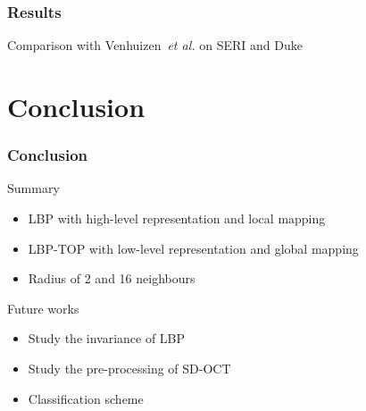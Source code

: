 \documentclass{beamer}
\begin{document}
\begin{frame}
\frametitle{Results}
\begin{block}{Comparison with Venhuizen~\emph{et al.} on SERI and Duke}

\begin{table}
\centering
{}
\label{tab:ComparisonRefandOurs}
\end{table}

\end{block}
\end{frame}

\section{Conclusion}

\begin{frame}
\frametitle{Conclusion}

\begin{block}{Summary}
  \begin{itemize}\footnotesize
    \item LBP with high-level representation and local mapping
    \item LBP-TOP with low-level representation and global mapping
    \item Radius of 2 and 16 neighbours
  \end{itemize}
\end{block}

\begin{block}{Future works}
  \begin{itemize}\footnotesize
    \item Study the invariance of LBP
    \item Study the pre-processing of SD-OCT
    \item Classification scheme
  \end{itemize}
\end{block}

\end{frame}
\end{document}
